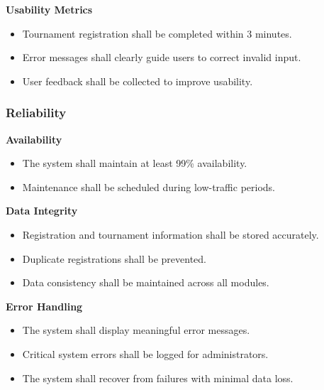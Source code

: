 \textbf{Usability Metrics}

\begin{itemize}
    \item Tournament registration shall be completed within 3 minutes.
    
    \item Error messages shall clearly guide users to correct invalid input.
    
    \item User feedback shall be collected to improve usability.
\end{itemize}


\subsubsection{Reliability}

\textbf{Availability}

\begin{itemize}
    \item The system shall maintain at least 99\% availability.
    
    \item Maintenance shall be scheduled during low-traffic periods.
\end{itemize}

\textbf{Data Integrity}

\begin{itemize}
    \item Registration and tournament information shall be stored accurately.
    
    \item Duplicate registrations shall be prevented.
    
    \item Data consistency shall be maintained across all modules.
\end{itemize}

\textbf{Error Handling}

\begin{itemize}
    \item The system shall display meaningful error messages.
    
    \item Critical system errors shall be logged for administrators.
    
    \item The system shall recover from failures with minimal data loss.
\end{itemize}

